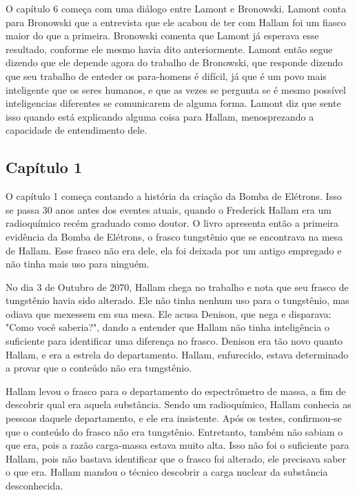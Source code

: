 \documentclass[14pt,portuguese]{extreport}
\begin{document}
    	  O capítulo 6 começa com uma diálogo entre Lamont e Bronowski. 
    	  Lamont conta para Bronowski que a entrevista que ele acabou de ter com Hallam foi um fiasco maior do que a primeira. 
    	  Bronowski comenta que Lamont já esperava esse resultado, conforme ele mesmo havia dito anteriormente. 
    	  Lamont então segue dizendo que ele depende agora do trabalho de Bronowski, que responde dizendo que seu trabalho de enteder os para-homens é difícil, 
    	  já que é um povo mais inteligente que os seres humanos, e que as vezes se pergunta se é mesmo possível inteligencias diferentes se comunicarem de alguma forma. 
    	  Lamont diz que sente isso quando está explicando alguma coisa para Hallam, menosprezando a capacidade de entendimento dele.

      \subsection{Capítulo 1}

    	  O capítulo 1 começa contando a história da criação da Bomba de Elétrons. Isso se passa 30 anos antes dos eventes atuais, quando o Frederick Hallam era um radioquímico recém graduado como doutor. 
    	  O livro apresenta então a primeira evidência da Bomba de Elétrons, o frasco tungstênio que se encontrava na mesa de Hallam. Esse frasco não era dele, ela foi deixada por um antigo empregado e 
    	  não tinha mais uso para ninguém. 
    	  
    	  No dia 3 de Outubro de 2070, Hallam chega no trabalho e nota que seu frasco de tungstênio havia sido alterado. Ele não tinha nenhum uso para o tungstênio, mas odiava que mexessem em sua mesa.
    	  Ele acusa Denison, que nega e disparava: "Como você saberia?", dando a entender que Hallam não tinha inteligência o suficiente para identificar uma diferença no frasco. Denison era 
    	  tão novo quanto Hallam, e era a estrela do departamento. Hallam, enfurecido, estava determinado a provar que o conteúdo não era tungstênio.
    	  
    	  Hallam levou o frasco para o departamento do espectrômetro de massa, a fim de descobrir qual era aquela substância. Sendo um radioquímico, Hallam conhecia as pessoas daquele departamento, e ele era 
    	  insistente. Após os testes, confirmou-se que o conteúdo do frasco não era tungstênio. Entretanto, também não sabiam o que era, pois a razão carga-massa estava muito alta. 
    	  Isso não foi o suficiente para Hallam, pois não bastava identificar que o frasco foi alterado, ele precisava saber o que era. Hallam mandou o técnico descobrir a carga nuclear da substância desconhecida.
    	  
\end{document}

